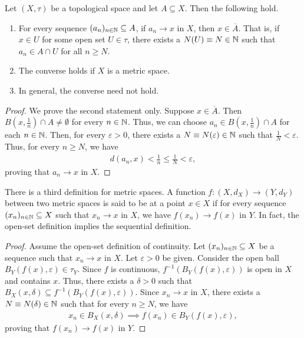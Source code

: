 \begin{lemma}
    Let $(X,\tau)$ be a topological space and let $A \subseteq X$. Then the following hold.
    \begin{enumerate}[label=(\roman*)]
        \item For every sequence $(a_{n})_{n \in \mathbb{N}} \subseteq A$, if $a_{n} \to x$ in $X$, then $x \in \overline{A}$. That is, if $x \in U$ for some open set $U \in \tau$, there exists a $N(U) \equiv N \in \mathbb{N}$ such that $a_{n} \in A \cap U$ for all $n \geq N$.
        \item The converse holds if $X$ is a metric space.
        \item In general, the converse need not hold.
    \end{enumerate}
\end{lemma}
\begin{proof}
    We prove the second statement only. Suppose $x \in \overline{A}$. Then $B(x, \frac{1}{n}) \cap A \neq \emptyset$ for every $n \in \mathbb{N}$. Thus, we can choose $a_{n} \in B(x, \frac{1}{n}) \cap A$ for each $n \in \mathbb{N}$. Then, for every $\varepsilon > 0$, there exists a $N \equiv N(\varepsilon) \in \mathbb{N}$ such that $\frac{1}{N} < \varepsilon$. Thus, for every $n \geq N$, we have
    \begin{align}
        d(a_{n}, x) < \frac{1}{n} \leq \frac{1}{N} < \varepsilon,
    \end{align}
    proving that $a_{n} \to x$ in $X$.
\end{proof}

There is a third definition for metric spaces. A function $f:(X,d_{X}) \to (Y,d_{Y})$ between two metric spaces is said to be  at a point $x \in X$ if for every sequence $(x_{n})_{n \in \mathbb{N}} \subseteq X$ such that $x_{n} \to x$ in $X$, we have $f(x_{n}) \to f(x)$ in $Y$. In fact, the open-set definition implies the sequential definition.

\begin{proof}
    Assume the open-set definition of continuity. Let $(x_{n})_{n \in \mathbb{N}} \subseteq X$ be a sequence such that $x_{n} \to x$ in $X$. Let $\varepsilon > 0$ be given. Consider the open ball $B_{Y}(f(x),\varepsilon) \in \tau_{Y}$. Since $f$ is continuous, $f^{-1}(B_{Y}(f(x),\varepsilon))$ is open in $X$ and contains $x$. Thus, there exists a $\delta > 0$ such that $B_{X}(x,\delta) \subseteq f^{-1}(B_{Y}(f(x),\varepsilon))$. Since $x_{n} \to x$ in $X$, there exists a $N \equiv N(\delta) \in \mathbb{N}$ such that for every $n \geq N$, we have
    \begin{align}
        x_{n} \in B_{X}(x,\delta) \implies f(x_{n}) \in B_{Y}(f(x),\varepsilon),
    \end{align}
    proving that $f(x_{n}) \to f(x)$ in $Y$.
\end{proof}

